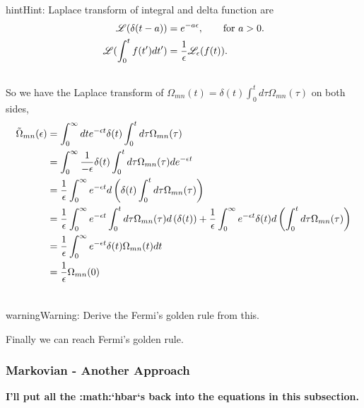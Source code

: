 \documentclass[letterpaper,10pt,english]{sphinxmanual}
\begin{document}
\begin{notice}{hint}{Hint:}
Laplace transform of integral and delta function are
\begin{gather}
\begin{split}\mathscr L (\delta(t-a)) &= e^{-a\epsilon}, \qquad \text{for } a>0. \\
\mathscr L (\int_0^t f(t') dt') & = \frac{1}{\epsilon} \mathscr L_\epsilon (f(t)).\end{split}\notag\\\begin{split}\end{split}\notag
\end{gather}
So we have the Laplace transform of $\Omega_{mn}(t) = \delta(t) \int_0^t d\tau \Omega_{mn}(\tau)$ on both sides,
\begin{gather}
\begin{split}\tilde \Omega_{mn}(\epsilon) & = \int_0^\infty dt e^{-\epsilon t}  \delta(t) \int_0^t d\tau \Omega_{mn}(\tau) \\
& = \int_0^\infty \frac{1}{-\epsilon}  \delta(t) \int_0^t d\tau \Omega_{mn}(\tau) d e^{-\epsilon t} \\
& = \frac{1}{\epsilon} \int_0^\infty   e^{-\epsilon t} d\left(\delta(t) \int_0^t d\tau \Omega_{mn}(\tau) \right)  \\
& = \frac{1}{\epsilon} \int_0^\infty   e^{-\epsilon t} \int_0^t d\tau \Omega_{mn}(\tau)   d\left(\delta(t) \right) + \frac{1}{\epsilon} \int_0^\infty   e^{-\epsilon t}  \delta(t)  d\left( \int_0^t d\tau \Omega_{mn}(\tau) \right)  \\
& = \frac{1}{\epsilon} \int_0^\infty   e^{-\epsilon t}  \delta(t) \Omega_{mn}(t)  dt  \\
& = \frac{1}{\epsilon}   \Omega_{mn}(0)\end{split}\notag\\\begin{split}\end{split}\notag
\end{gather}\end{notice}

\begin{notice}{warning}{Warning:}
Derive the Fermi's golden rule from this.
\end{notice}

Finally we can reach Fermi's golden rule.


\subsubsection{Markovian - Another Approach}
\label{nonequilibrium/quantumMasterEqn:markovian-another-approach}
\textbf{I'll put all the :math:{}`hbar{}`s back into the equations in this subsection.}
\end{document}
